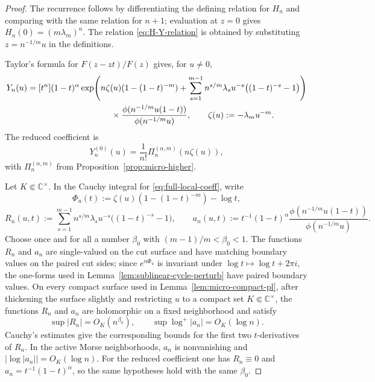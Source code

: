 \documentclass[reqno]{article}
\theoremstyle{definition}
\theoremstyle{remark}
\theoremstyle{plain}
\newcommand{\C}{\mathbb C}
\begin{document}
\begin{proof}
The recurrence follows by differentiating the defining relation for $H_n$ and comparing with the same relation for $n+1$; evaluation at $z=0$ gives $H_n(0)=(m\lambda_m)^n$. The relation \eqref{eq:H-Y-relation} is obtained by substituting $z=n^{-1/m}u$ in the definitions.

Taylor's formula for $F(z-zt)/F(z)$ gives, for $u\ne0$,
\begin{align}\label{eq:full-local-coeff}
Y_n(u)&=[t^n](1-t)^\alpha
\exp\!\left(n\zeta(u)(1-(1-t)^{-m})
+\sum_{s=1}^{m-1}n^{s/m}\lambda_su^{-s}\bigl((1-t)^{-s}-1\bigr)\right)  \\
&\hspace{35mm}\times
\frac{\phi(n^{-1/m}u(1-t))}{\phi(n^{-1/m}u)},
\qquad \zeta(u):=-\lambda_m u^{-m}.\nonumber
\end{align}
The reduced coefficient is
$$Y_n^{(0)}(u)=\frac1{n!}\Pi_n^{(\alpha,m)}\!\left(n\zeta(u)\right),$$
with $\Pi_n^{(\alpha,m)}$ from Proposition~\ref{prop:micro-higher}.

Let $K\Subset\C^\times$. In the Cauchy integral for \eqref{eq:full-local-coeff}, write
\[
\Phi_u(t):=\zeta(u)(1-(1-t)^{-m})-\log t,
\]
\[
R_n(u,t):=\sum_{s=1}^{m-1}n^{s/m}\lambda_su^{-s}\bigl((1-t)^{-s}-1\bigr),
\qquad
 a_n(u,t):=t^{-1}(1-t)^\alpha
\frac{\phi(n^{-1/m}u(1-t))}{\phi(n^{-1/m}u)}.
\]
Choose once and for all a number $\beta_0$ with $(m-1)/m<\beta_0<1$. The functions $R_n$ and $a_n$ are single-valued on the cut surface and have matching boundary values on the paired cut sides; since $e^{n\Phi_u}$ is invariant under $\log t\mapsto\log t+2\pi i$, the one-forms used in Lemma~\ref{lem:sublinear-cycle-perturb} have paired boundary values. On every compact surface used in Lemma~\ref{lem:micro-compact-pl}, after thickening the surface slightly and restricting $u$ to a compact set $K\Subset\C^\times$, the functions $R_n$ and $a_n$ are holomorphic on a fixed neighborhood and satisfy
\[
\sup |R_n|=O_K(n^{\beta_0}),
\qquad
\sup\log^+|a_n|=O_K(\log n).
\]
Cauchy's estimates give the corresponding bounds for the first two $t$-derivatives of $R_n$. In the active Morse neighborhoods, $a_n$ is nonvanishing and $|\log|a_n||=O_K(\log n)$. For the reduced coefficient one has $R_n\equiv0$ and $a_n=t^{-1}(1-t)^\alpha$, so the same hypotheses hold with the same $\beta_0$.


\end{proof}
\end{document}
